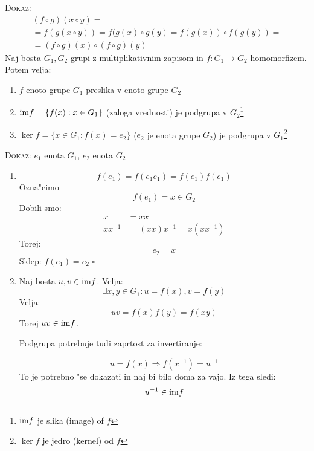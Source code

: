 \textsc{Dokaz:}
\begin{multline*}
	(f \circ g) (x \circ y) = \\
	= f(g(x \circ y)) = f(g(x) \circ g(y) = f(g(x)) \circ f(g(y)) = \\
	= (f\circ g)(x) \circ (f \circ g) (y)
\end{multline*}
Naj bosta $G_1, G_2$ grupi z multiplikativnim zapisom in $f: G_1 \to G_2$ homomorfizem. Potem velja:
\begin{enumerate}[(1)]
	\item $f$ enoto grupe $G_1$ preslika v enoto grupe $G_2$
	\item $\text{im} f = \{f(x): x \in G_1\}$ (zaloga vrednosti) je podgrupa v $G_2$\footnote{$\text{im} f$ je slika (image) of $f$}
	\item $\ker f = \{x \in G_1: f(x) = e_2\}$ ($e_2$ je enota grupe $G_2$) je podgrupa v $G_1$\footnote{$\ker f$ je jedro (kernel) od $f$}
\end{enumerate}
\textsc{Dokaz:} $e_1$ enota $G_1$, $e_2$ enota $G_2$
\begin{enumerate}[(1)]
	\item {}
	\begin{equation*}
	f(e_1) = f(e_1 e_1) = f(e_1)f(e_1)
	\end{equation*}
	Ozna"cimo
	\begin{equation*}
	f(e_1) = x \in G_2
	\end{equation*}
	Dobili smo:
	\begin{align*}
	x &= xx \\
	xx^{-1} &= (xx)x^{-1} = x(xx^{-1})
	\end{align*}
	Torej:
	\begin{equation*}
	e_2 = x
	\end{equation*}
	Sklep: $f(e_1) = e_2$ \hfill $\square$
	
	\item {}
	
	Naj bosta $u, v \in \text{im} f$. Velja:
	\begin{equation*}
	\exists x, y \in G_1: u = f(x), v = f(y)
	\end{equation*}
	Velja:
	\begin{equation*}
	uv = f(x)f(y) = f(xy)
	\end{equation*}
	Torej $uv \in \text{im} f$.
	
	Podgrupa potrebuje tudi zaprtost za invertiranje:
	
	\begin{equation*}
	u = f(x) \Rightarrow f(x^{-1}) = u^{-1}
	\end{equation*}
	To je potrebno "se dokazati in naj bi bilo doma za vajo. Iz tega sledi:
	\begin{equation*}
	u^{-1} \in \text{im} f
	\end{equation*}
\end{enumerate}

